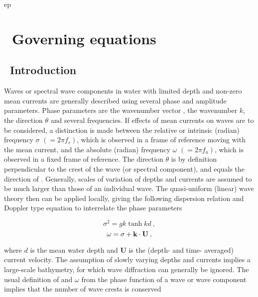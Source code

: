 ep \section{~Governing equations} \label{chapt:eq}
\newcounters
\vssub
\subsection{~Introduction}
\vssub

Waves or spectral wave components in water with limited depth and non-zero
mean currents are generally described using several phase and amplitude
parameters. Phase parameters are the wavenumber vector {\bk}, the wavenumber
$k$, the direction $\theta$ and several frequencies. If effects of mean
currents on waves are to be considered, a distinction is made between the
relative or intrinsic (radian) frequency $\sigma$ $(= 2 \pi f_r)$, which is
observed in a frame of reference moving with the mean current, and the
absolute (radian) frequency $\omega$ $(= 2 \pi f_a)$, which is observed in a
fixed frame of reference.  The direction $\theta$ is by definition
perpendicular to the crest of the wave (or spectral component), and equals the
direction of {\bk}. Generally, scales of variation of depths and currents are
assumed to be much larger than those of an individual wave. The quasi-uniform
(linear) wave theory then can be applied locally, giving the following
dispersion relation and Doppler type equation to interrelate the phase
parameters


\begin{equation}
\sigma ^2 = g k \tanh kd \: ,
\label{eq:disp}
\end{equation}
\begin{equation}
\omega = \sigma + {\mbox{\bf k}} \cdot {\bf U} \: ,
\label{eq:doppler}
\end{equation}

\noindent
where $d$ is the mean water depth and {\bf U} is the (depth- and time-
averaged) current velocity. The assumption of slowly varying depths and
currents implies a large-scale bathymetry, for which wave diffraction can
generally be ignored. The usual definition of {\bk} and $\omega$ from the
phase function of a wave or wave component implies that the number of wave
crests is conserved \citep[see, e.g.,][]{bk:Phi77,bk:Mei83}


